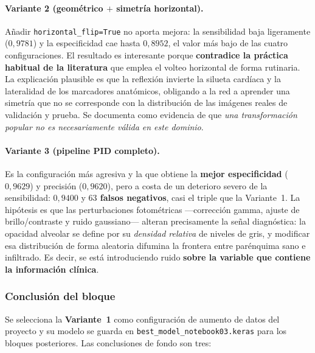 \documentclass[11pt, a4paper]{article}
\numberwithin{equation}{section}
\begin{document}
\paragraph{Variante 2 (geométrico $+$ simetría horizontal).}
Añadir \texttt{horizontal\_flip=True} no aporta mejora: la sensibilidad baja
ligeramente ($0{,}9781$) y la especificidad cae hasta $0{,}8952$, el valor más bajo de
las cuatro configuraciones. El resultado es interesante porque \textbf{contradice la
práctica habitual de la literatura} que emplea el volteo horizontal de forma
rutinaria. La explicación plausible es que la reflexión invierte la silueta cardíaca
y la lateralidad de los marcadores anatómicos, obligando a la red a aprender una
simetría que no se corresponde con la distribución de las imágenes reales de
validación y prueba. Se documenta como evidencia de que \textit{una transformación
popular no es necesariamente válida en este dominio}.

\paragraph{Variante 3 (pipeline PID completo).}
Es la configuración más agresiva y la que obtiene la \textbf{mejor especificidad}
($0{,}9629$) y precisión ($0{,}9620$), pero a costa de un deterioro severo de la
sensibilidad: $0{,}9400$ y \textbf{$63$ falsos negativos}, casi el triple que la
Variante~1. La hipótesis es que las perturbaciones fotométricas ---corrección gamma,
ajuste de brillo/contraste y ruido gaussiano--- alteran precisamente la señal
diagnóstica: la opacidad alveolar se define por su \textit{densidad relativa} de
niveles de gris, y modificar esa distribución de forma aleatoria difumina la frontera
entre parénquima sano e infiltrado. Es decir, se está introduciendo ruido
\textbf{sobre la variable que contiene la información clínica}.

\subsubsection{Conclusión del bloque}

Se selecciona la \textbf{Variante~1} como configuración de aumento de datos del
proyecto y su modelo se guarda en \texttt{best\_model\_notebook03.keras} para los
bloques posteriores. Las conclusiones de fondo son tres:
\end{document}
